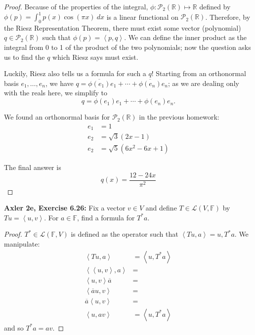 \documentclass{article}
\newcommand{\R}{\mathbb{R}}
\newcommand{\F}{\mathbb{F}}
\newcommand{\ol}[1]{\overline{#1}}
\newcommand{\iprod}[2]{\left\langle #1, #2 \right\rangle}
\begin{document}
\begin{proof}
    Because of the properties of the integral, $\phi : \mathcal{P}_2(\R) \mapsto \R$ defined by $\phi(p) = \int_0^1 p(x) \cos(\pi x) \: dx$ is a linear functional on $\mathcal{P}_2(\R)$. Therefore, by the Riesz Representation Theorem, there must exist some vector (polynomial) $q \in \mathcal{P}_2(\R)$ such that $\phi(p) = \iprod{p}{q}$. We can define the inner product as the integral from 0 to 1 of the product of the two polynomials; now the question asks us to find the $q$ which Riesz says must exist. 

    Luckily, Riesz also tells us a formula for such a $q$! Starting from an orthonormal basis $e_1, \dots, e_n$, we have $q = \ol{\phi(e_1)} e_1 + \cdots + \ol{\phi(e_n)}e_n$; as we are dealing only with the reals here, we simplify to
    $$q = \phi(e_1)e_1 + \cdots + \phi(e_n) e_n.$$

    We found an orthonormal basis for $\mathcal{P}_2(\R)$ in the previous homework:
    \begin{align*}
        e_1 &= 1 \\
        e_2 &= \sqrt{3}(2x - 1) \\
        e_2 &= \sqrt{5}(6x^2 - 6x + 1)
    \end{align*}

    The final answer is
    $$q(x) = \frac{12 - 24x}{\pi^2}$$
\end{proof}




\textbf{Axler 2e, Exercise 6.26: } %
Fix a vector $v \in V$ and define $T \in \mathcal{L}(V, \F)$ by $Tu = \iprod{u}{v}$. For $a \in \F$, find a formula for $T^* a$.

\begin{proof}
    $T^* \in \mathcal{L}(\F, V)$ is defined as the operator such that $\iprod{Tu}{a} = {u, T^* a}$. We manipulate:
    \begin{align*}
        \iprod{Tu}{a} &= \iprod{u}{T^* a} \\
        \iprod{\iprod{u}{v}}{a} &= \\
        \iprod{u}{v}\ol{a} &= \\
        \iprod{\ol{a}u}{v} &= \\
        \ol{a} \iprod{u}{v} &= \\
        \iprod{u}{av} &= \iprod{u}{T^* a}
    \end{align*}
    and so $T^* a = av$.    
\end{proof}
\end{document}
